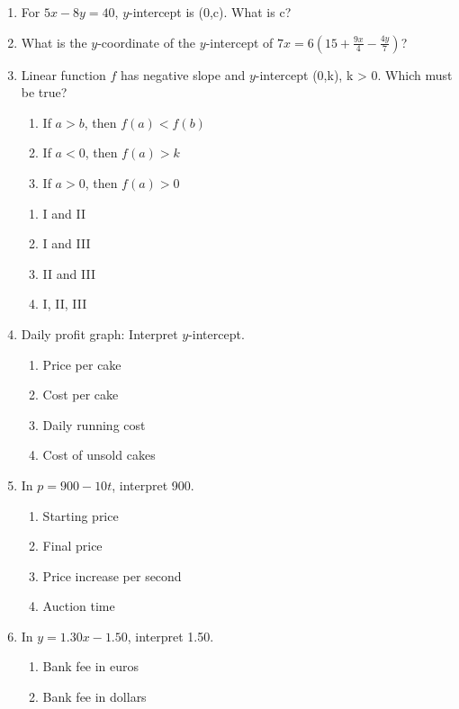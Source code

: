 \documentclass[12pt]{exam}
\begin{document}
\begin{enumerate}
    \item For $5x - 8y = 40$, $y$-intercept is (0,c). What is c?
    \item What is the $y$-coordinate of the $y$-intercept of $7x = 6 \left( 15 + \frac{9x}{4} - \frac{4y}{7} \right)$?
    \item Linear function $f$ has negative slope and $y$-intercept (0,k), k > 0. Which must be true?
    \begin{enumerate}[label=\Roman*)]
        \item If $a > b$, then $f(a) < f(b)$
        \item If $a < 0$, then $f(a) > k$
        \item If $a > 0$, then $f(a) > 0$
    \end{enumerate}
    \begin{enumerate}[label=\Alph*)]
        \item I and II
        \item I and III
        \item II and III
        \item I, II, III
    \end{enumerate}
    \item Daily profit graph: Interpret $y$-intercept.
    \begin{enumerate}[label=\Alph*)]
        \item Price per cake
        \item Cost per cake
        \item Daily running cost
        \item Cost of unsold cakes
    \end{enumerate}
    \item In $p = 900 - 10t$, interpret 900.
    \begin{enumerate}[label=\Alph*)]
        \item Starting price
        \item Final price
        \item Price increase per second
        \item Auction time
    \end{enumerate}
    \item In $y = 1.30x - 1.50$, interpret 1.50.
    \begin{enumerate}[label=\Alph*)]
        \item Bank fee in euros
        \item Bank fee in dollars

\end{enumerate}
\end{enumerate}
\end{document}
